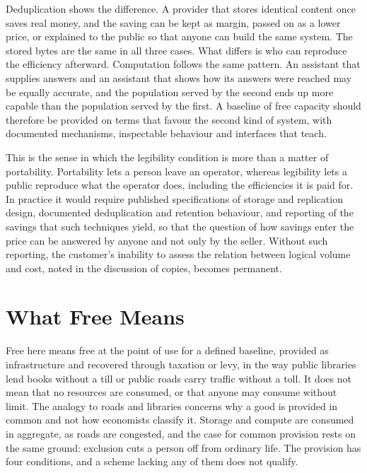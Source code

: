 \documentclass[12pt]{article}
\begin{document}
Deduplication shows the difference. A provider that stores identical content once saves real money, and the saving can be kept as margin, passed on as a lower price, or explained to the public so that anyone can build the same system. The stored bytes are the same in all three cases. What differs is who can reproduce the efficiency afterward. Computation follows the same pattern. An assistant that supplies answers and an assistant that shows how its answers were reached may be equally accurate, and the population served by the second ends up more capable than the population served by the first. A baseline of free capacity should therefore be provided on terms that favour the second kind of system, with documented mechanisms, inspectable behaviour and interfaces that teach.

This is the sense in which the legibility condition is more than a matter of portability. Portability lets a person leave an operator, whereas legibility lets a public reproduce what the operator does, including the efficiencies it is paid for. In practice it would require published specifications of storage and replication design, documented deduplication and retention behaviour, and reporting of the savings that such techniques yield, so that the question of how savings enter the price can be answered by anyone and not only by the seller. Without such reporting, the customer's inability to assess the relation between logical volume and cost, noted in the discussion of copies, becomes permanent.

\section{What Free Means}\label{sec:freemeans}

Free here means free at the point of use for a defined baseline, provided as infrastructure and recovered through taxation or levy, in the way public libraries lend books without a till or public roads carry traffic without a toll. It does not mean that no resources are consumed, or that anyone may consume without limit. The analogy to roads and libraries concerns why a good is provided in common and not how economists classify it. Storage and compute are consumed in aggregate, as roads are congested, and the case for common provision rests on the same ground: exclusion cuts a person off from ordinary life. The provision has four conditions, and a scheme lacking any of them does not qualify.
\end{document}
